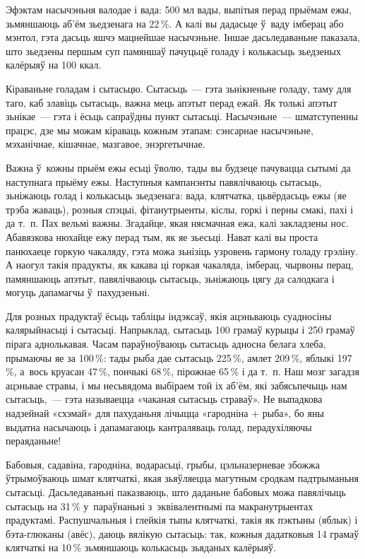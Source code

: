 Эфэктам насычэньня валодае і вада: 500 мл вады, выпітыя перад прыёмам ежы, зьмяншаюць аб'ём зьедзенага на 22\,\%. А калі вы дадасьце ў~ваду імберац або мэнтол, гэта дасьць яшчэ мацнейшае насычэньне. Іншае дасьледаваньне паказала, што зьедзены першым суп памяншаў пачуцьцё голаду і колькасьць зьедзеных калёрыяў на 100 ккал.

Кіраваньне голадам і сытасьцю. Сытасьць~--- гэта зьнікненьне голаду, таму для таго, каб злавіць сытасьць, важна мець апэтыт перад ежай. Як толькі апэтыт зьнікае~--- гэта і ёсьць сапраўдны пункт сытасьці. Насычэньне~--- шматступенны працэс, дзе мы можам кіраваць кожным этапам: сэнсарнае насычэньне, мэханічнае, кішачнае, мазгавое, энэргетычнае.

Важна ў~кожны прыём ежы есьці ўволю, тады вы будзеце пачувацца сытымі да наступнага прыёму ежы. Наступныя кампанэнты павялічваюць сытасьць, зьніжаюць голад і колькасьць зьедзенага: вада, клятчатка, цьвёрдасьць ежы (яе трэба жаваць), розныя спэцыі, фітанутрыенты, кіслы, горкі і перны смакі, пахі і да т.~п. Пах вельмі важны. Згадайце, якая нясмачная ежа, калі закладзены нос. Абавязкова нюхайце ежу перад тым, як яе зьесьці. Нават калі вы проста панюхаеце горкую чакаляду, гэта можа зьнізіць узровень гармону голаду грэліну. А наогул такія прадукты, як какава ці горкая чакаляда, імберац, чырвоны перац, памяншаюць апэтыт, павялічваюць сытасьць, зьніжаюць цягу да салодкага і могуць дапамагчы ў~пахудзеньні.

Для розных прадуктаў ёсьць табліцы індэксаў, якія ацэньваюць суадносіны калярыйнасьці і сытасьці. Напрыклад, сытасьць 100 грамаў курыцы і 250 грамаў пірага аднолькавая. Часам параўноўваюць сытасьць адносна белага хлеба, прымаючы яе за 100\,\%: тады рыба дае сытасьць 225\,\%, амлет 209\,\%, яблыкі 197\,\%, а~вось круасан 47\,\%, пончыкі 68\,\%, пірожнае 65\,\% і да т.~п. Наш мозг загадзя ацэньвае стравы, і мы несьвядома выбіраем той іх аб'ём, які забясьпечыць нам сытасьць,~--- гэта называецца «чаканая сытасьць страваў». Не выпадкова надзейнай «схэмай» для пахуданьня лічыцца «гародніна + рыба», бо яны выдатна насычаюць і дапамагаюць кантраляваць голад, перадухіляючы пераяданьне!

Бабовыя, садавіна, гародніна, водарасьці, грыбы, цэльназерневае збожжа ўтрымоўваюць шмат клятчаткі, якая зьяўляецца магутным сродкам падтрыманьня сытасьці. Дасьледаваньні паказваюць, што даданьне бабовых можа павялічыць сытасьць на 31\,\% у~параўнаньні з~эквівалентнымі па макранутрыентах прадуктамі. Распушчальныя і глейкія тыпы клятчаткі, такія як пэктыны (яблык) і бэта-глюканы (авёс), даюць вялікую сытасьць: так, кожныя дадатковыя 14 грамаў клятчаткі на 10\,\% зьмяншаюць колькасьць зьяданых калёрыяў.

